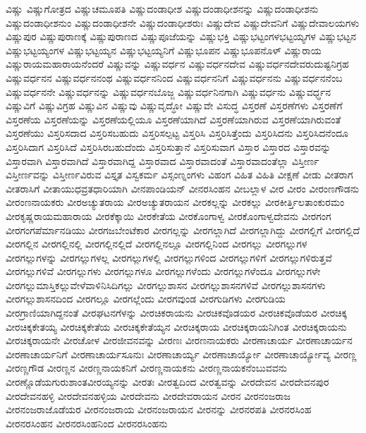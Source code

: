 {ವಿಷ್ಣು
ವಿಷ್ಣುಗೋತ್ರದ
ವಿಷ್ಣುಚಮೂಪತಿ
ವಿಷ್ಣುದಂಡಾಧೀಶ
ವಿಷ್ಣುದಂಡಾಧೀಶನನ್ನು
ವಿಷ್ಣುದಂಡಾಧೀಶನು
ವಿಷ್ಣುದಂಡಾಧೀಶನುಂ
ವಿಷ್ಣುದಂಡಾಧೀಶನೇ
ವಿಷ್ಣುದಂಡಾಧೀಶರುಃ
ವಿಷ್ಣುದೇವ
ವಿಷ್ಣುದೇವನಿಗೆ
ವಿಷ್ಣುದೇವಾಲಯಗಳು
ವಿಷ್ಣುಪುರ
ವಿಷ್ಣುಪುರಾಣಕ್ಕೆ
ವಿಷ್ಣುಪುರಾಣದ
ವಿಷ್ಣುಪೂಜೆಯನ್ನು
ವಿಷ್ಣುಭಕ್ತಿ
ವಿಷ್ಣುಭಟ್ಟಂಗಳಭಟ್ಟಯ್ಯಗಳ
ವಿಷ್ಣುಭಟ್ಟನ
ವಿಷ್ಣುಭಟ್ಟಯ್ಯಂಗಳ
ವಿಷ್ಣುಭಟ್ಟಯ್ಯನ
ವಿಷ್ಣುಭಟ್ಟಯ್ಯನಿಗೆ
ವಿಷ್ಣುಭೂಪನ
ವಿಷ್ಣುಭೂಪನೊಳ್
ವಿಷ್ಣುರಾಯ
ವಿಷ್ಣುರಾಯಮಹಾರಾಯನೆಂದರೆ
ವಿಷ್ಣುವನ್ನು
ವಿಷ್ಣುವರ್ಧನ
ವಿಷ್ಣುವರ್ಧನದೇವ
ವಿಷ್ಣುವರ್ಧನದೇವರುದುಷ್ಟನಿಗ್ರಹ
ವಿಷ್ಣುವರ್ಧನನ
ವಿಷ್ಣುವರ್ಧನನಂಥ
ವಿಷ್ಣುವರ್ಧನನಿಂದ
ವಿಷ್ಣುವರ್ಧನನಿಗೆ
ವಿಷ್ಣುವರ್ಧನನು
ವಿಷ್ಣುವರ್ಧನನೆಂಬ
ವಿಷ್ಣುವರ್ಧನನೇ
ವಿಷ್ಣುವರ್ಧನನ್ನು
ವಿಷ್ಣುವರ್ಧನಬೊಜ್ಜ
ವಿಷ್ಣುವರ್ಧನಿನಗಾಗಿ
ವಿಷ್ಣುವರ್ಧನು
ವಿಷ್ಣುವರ್ಧ್ಧನ
ವಿಷ್ಣುವಿಗೆ
ವಿಷ್ಣುವಿಗ್ರಹ
ವಿಷ್ಣುವಿನ
ವಿಷ್ಣುವು
ವಿಷ್ಣುವೃದ್ಧೋ
ವಿಷ್ಣುವೇ
ವಿಸುದ್ಧ
ವಿಸ್ತರಣೆ
ವಿಸ್ತರಣೆಗಳು
ವಿಸ್ತರಣೆಗೆ
ವಿಸ್ತರಣೆಯ
ವಿಸ್ತರಣೆಯನ್ನು
ವಿಸ್ತರಣೆಯಲ್ಲಿಯೂ
ವಿಸ್ತರಣೆಯಾಗಿದೆ
ವಿಸ್ತರಣೆಯಾಗಿರುವ
ವಿಸ್ತರಣೆಯಾಗಿರುವಂತೆ
ವಿಸ್ತರಣೆಯು
ವಿಸ್ತರಿಸದಾದ
ವಿಸ್ತರಿಸಬಹುದು
ವಿಸ್ತರಿಸಲ್ಪಟ್ಟ
ವಿಸ್ತರಿಸಿ
ವಿಸ್ತರಿಸಿತ್ತೆಂದು
ವಿಸ್ತರಿಸಿದನು
ವಿಸ್ತರಿಸಿದನೆಂದೂ
ವಿಸ್ತರಿಸಿದಾಗ
ವಿಸ್ತರಿಸಿದೆ
ವಿಸ್ತರಿಸಿರಬಹುದೆಂದು
ವಿಸ್ತರಿಸುತ್ತಾನೆ
ವಿಸ್ತರಿಸುವಾಗ
ವಿಸ್ತಾರ
ವಿಸ್ತಾರದ
ವಿಸ್ತಾರವನ್ನು
ವಿಸ್ತಾರವಾಗಿ
ವಿಸ್ತಾರವಾಗಿದೆ
ವಿಸ್ತಾರವಾಗಿದ್ದ
ವಿಸ್ತಾರವಾದ
ವಿಸ್ತಾರವಾದಂತೆ
ವಿಸ್ತಾರವಾದಂತೆಲ್ಲಾ
ವಿಸ್ತೀರ್ಣ
ವಿಸ್ತೀರ್ಣವನ್ನು
ವಿಸ್ತೀರ್ಣವಿರುವ
ವಿಸ್ತೃತ
ವಿಸ್ವಕರ್ಮ
ವಿಸ್ಸಂಣ್ನಂಗಳು
ವಿಹಂಗ
ವಿಹಿತ
ವಿಹಿತಿ
ವೀಕ್ಷಣೆ
ವೀಡು
ವೀತರಾಗ
ವೀತರಾಸಿಗೆ
ವೀತಾಯುಧವ್ರತಧಾರಿಯಾಗಿ
ವೀನಪಾಂಡಿಯನ್
ವೀನರಸಿಂಹನ
ವೀಬಲ್ಲಾಳ
ವೀರ
ವೀರಂ
ವೀರಂಣಗೌಡನು
ವೀರಂಣನಾಯಕರು
ವೀರಅಚ್ಯುತರಾಯ
ವೀರಅಚ್ಯುತರಾಯನ
ವೀರಕಲ್ಲನ್ನು
ವೀರಕಲ್ಲು
ವೀರಕೀರ್ತ್ತಿಲತಾಂಕುರಮಂ
ವೀರಕೃಷ್ಣರಾಯಮಹಾರಾಯ
ವೀರಕೆಕ್ಕಾಯಿ
ವೀರಕೇತೆಯ
ವೀರಕೊಂಗಾಳ್ವ
ವೀರಕೊಂಗಾಳ್ವದೇವನು
ವೀರಗಂಗ
ವೀರಗಂಗಪೆರ್ಮಾನಡಿಯು
ವೀರಗಜಬೇಂಟೆಕಾರ
ವೀರಗಲ್ಲನ್ನು
ವೀರಗಲ್ಲಾಗಿದೆ
ವೀರಗಲ್ಲಾಗಿದ್ದು
ವೀರಗಲ್ಲಿಗೆ
ವೀರಗಲ್ಲಿದೆ
ವೀರಗಲ್ಲಿನ
ವೀರಗಲ್ಲಿನಲ್ಲಿ
ವೀರಗಲ್ಲಿನಲ್ಲಿದೆ
ವೀರಗಲ್ಲಿನಲ್ಲೂ
ವೀರಗಲ್ಲಿನಿಂದ
ವೀರಗಲ್ಲು
ವೀರಗಲ್ಲುಗಳ
ವೀರಗಲ್ಲುಗಳನ್ನು
ವೀರಗಲ್ಲುಗಳಲ್ಲ
ವೀರಗಲ್ಲುಗಳಲ್ಲಿ
ವೀರಗಲ್ಲುಗಳಿಂದ
ವೀರಗಲ್ಲುಗಳಿಗೆ
ವೀರಗಲ್ಲುಗಳಿರುತ್ತವೆ
ವೀರಗಲ್ಲುಗಳಿವೆ
ವೀರಗಲ್ಲುಗಳು
ವೀರಗಲ್ಲುಗಳೂ
ವೀರಗಲ್ಲುಗಳೆಂದು
ವೀರಗಲ್ಲುಗಳೆಂದೂ
ವೀರಗಲ್ಲುಗಳೇ
ವೀರಗಲ್ಲುಮಾಸ್ತಿಕಲ್ಲುವೇಳೆವಾಳಿನಿಸಿದಿಗಲ್ಲು
ವೀರಗಲ್ಲುಶಾಸನ
ವೀರಗಲ್ಲುಶಾಸನಗಳಿವೆ
ವೀರಗಲ್ಲುಶಾಸನಗಳು
ವೀರಗಲ್ಲುಶಾಸನದಿಂದ
ವೀರಗಲ್ಲೂ
ವೀರಗಲ್ಲೆಂದು
ವೀರಗವುಂಡ
ವೀರಗುಡಿಗಳು
ವೀರಗುಡಿಯ
ವೀರಗ್ರಾಣಿಯಾಗಿದ್ದನಂತೆ
ವೀರಘಟನಗೆಳನ್ನು
ವೀರಚಿಕರಾಯನು
ವೀರಚಿಕವೊಡಯರ
ವೀರಚಿಕವೊಡೆಯರ
ವೀರಚಿಕ್ಕ
ವೀರಚಿಕ್ಕಕೇತಯ್ಯ
ವೀರಚಿಕ್ಕಕೇತೆಯ
ವೀರಚಿಕ್ಕಕೇತೆಯ್ಯನ
ವೀರಚಿಕ್ಕರಾಯ
ವೀರಚಿಕ್ಕರಾಯನಿಗಿಂತ
ವೀರಚಿಕ್ಕರಾಯನು
ವೀರಚಿಕ್ಕರಾಯನೇ
ವೀರಚೋಳ
ವೀರಜೀವನವನ್ನು
ವೀರಣಃ
ವೀರಣನಾಯಕರು
ವೀರಣಾಚಾರ್ಯ
ವೀರಣಾಚಾರ್ಯನ
ವೀರಣಾಚಾರ್ಯನಿಗೆ
ವೀರಣಾಚಾರ್ಯಸೂನುಃ
ವೀರಣಾಚಾರ್ಯ್ಯ
ವೀರಣಾಚಾರ್ಯ್ಯೋ
ವೀರಣಾಚಾರ್ಯ್ಯೋವ್ಯ
ವೀರಣ್ಣ
ವೀರಣ್ಣಗೌಡ
ವೀರಣ್ಣನ
ವೀರಣ್ಣನಾಯಕನಿಗೆ
ವೀರಣ್ಣನಾಯಕನು
ವೀರಣ್ಣನಾಯಕನೆಂಬುವವನು
ವೀರಣ್ಣೊಡೆಯಗುರುಶಾಂತವೀರಯ್ಯನನ್ನು
ವೀರತಃ
ವೀರತ್ವದಿಂದ
ವೀರತ್ವವನ್ನು
ವೀರದೇವನ
ವೀರದೇವನಪುರ
ವೀರದೇವನಹಳ್ಳಿ
ವೀರದೇವನಹಳ್ಳಿಯ
ವೀರದೇವನು
ವೀರದೇವರಾಯನ
ವೀರನ
ವೀರನಂಜರಾಜ
ವೀರನಂಜರಾಜೊಡೆಯರ
ವೀರನಂಜರಾಯ
ವೀರನಂಜರಾಯನ
ವೀರನನ್ನು
ವೀರನರಪತಿ
ವೀರನರಸಿಂಹ
ವೀರನರಸಿಂಹನ
ವೀರನರಸಿಂಹನಿಂದ
ವೀರನರಸಿಂಹನು
}

